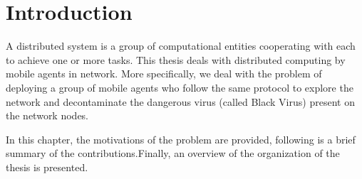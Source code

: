 \chapter {Introduction}
\label{INTRO}

A distributed system is a group of computational entities cooperating with each to achieve one or more tasks. This thesis deals with distributed computing by mobile agents in network. More specifically, we deal with the problem of deploying a group of mobile agents who follow the same protocol to explore the network and decontaminate the dangerous virus (called Black Virus) present on the network nodes.

  In this chapter, the motivations of the problem are provided, following is a brief summary of the contributions.Finally, an overview of the organization of the thesis is presented.


